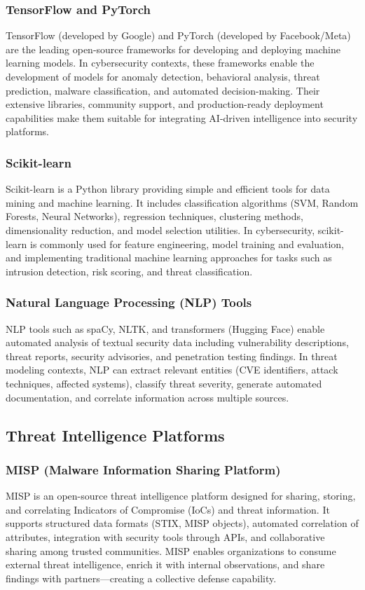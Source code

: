 \subsubsection{TensorFlow and PyTorch}
TensorFlow (developed by Google) and PyTorch (developed by Facebook/Meta) are the leading open-source frameworks for developing and deploying machine learning models. In cybersecurity contexts, these frameworks enable the development of models for anomaly detection, behavioral analysis, threat prediction, malware classification, and automated decision-making. Their extensive libraries, community support, and production-ready deployment capabilities make them suitable for integrating AI-driven intelligence into security platforms.

\subsubsection{Scikit-learn}
Scikit-learn is a Python library providing simple and efficient tools for data mining and machine learning. It includes classification algorithms (SVM, Random Forests, Neural Networks), regression techniques, clustering methods, dimensionality reduction, and model selection utilities. In cybersecurity, scikit-learn is commonly used for feature engineering, model training and evaluation, and implementing traditional machine learning approaches for tasks such as intrusion detection, risk scoring, and threat classification.

\subsubsection{Natural Language Processing (NLP) Tools}
NLP tools such as spaCy, NLTK, and transformers (Hugging Face) enable automated analysis of textual security data including vulnerability descriptions, threat reports, security advisories, and penetration testing findings. In threat modeling contexts, NLP can extract relevant entities (CVE identifiers, attack techniques, affected systems), classify threat severity, generate automated documentation, and correlate information across multiple sources.

\subsection{Threat Intelligence Platforms}

\subsubsection{MISP (Malware Information Sharing Platform)}
MISP is an open-source threat intelligence platform designed for sharing, storing, and correlating Indicators of Compromise (IoCs) and threat information. It supports structured data formats (STIX, MISP objects), automated correlation of attributes, integration with security tools through APIs, and collaborative sharing among trusted communities. MISP enables organizations to consume external threat intelligence, enrich it with internal observations, and share findings with partners---creating a collective defense capability.

